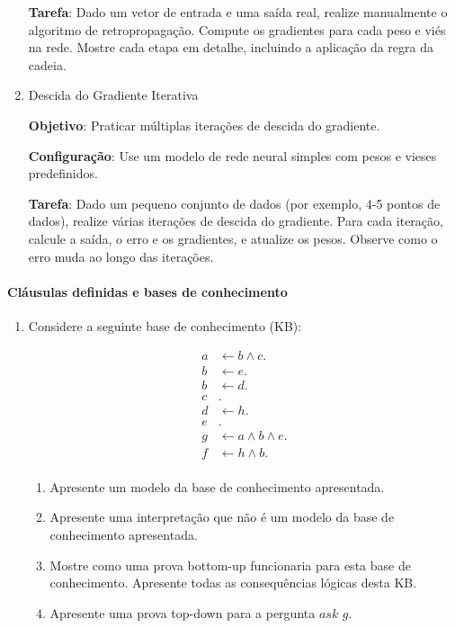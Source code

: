 \documentclass{article}
\begin{document}
\begin{enumerate}
\textbf{Tarefa}: Dado um vetor de entrada e uma saída real, realize manualmente o algoritmo de retropropagação. Compute os gradientes para cada peso e viés na rede. Mostre cada etapa em detalhe, incluindo a aplicação da regra da cadeia.

\item Descida do Gradiente Iterativa

\textbf{Objetivo}: Praticar múltiplas iterações de descida do gradiente.

\textbf{Configuração}: Use um modelo de rede neural simples com pesos e vieses predefinidos.

\textbf{Tarefa}: Dado um pequeno conjunto de dados (por exemplo, 4-5 pontos de dados), realize várias iterações de descida do gradiente. Para cada iteração, calcule a saída, o erro e os gradientes, e atualize os pesos. Observe como o erro muda ao longo das iterações.

\end{enumerate}

\pagebreak


\paragraph{Cláusulas definidas e bases de conhecimento}


\begin{enumerate}
    \item Considere a seguinte base de conhecimento (KB):
    
    \begin{center}
        \begin{align*}
         a & \leftarrow b \wedge c. \\ 
         b & \leftarrow e. \\ 
         b & \leftarrow d. \\ 
         c &. \\ 
         d & \leftarrow h. \\ 
         e &. \\
         g & \leftarrow a \wedge b  \wedge e. \\
         f & \leftarrow h \wedge b. \\  
        \end{align*}
    \end{center}
    

    \begin{enumerate}
        \item Apresente um modelo da base de conhecimento apresentada.
        \item Apresente uma interpretação que não é um modelo da base de conhecimento apresentada.
        \item Mostre como uma prova bottom-up funcionaria para esta base de conhecimento. Apresente todas as consequências lógicas desta KB.
        \item Apresente uma prova top-down para a pergunta $ask$ $g$.
    \end{enumerate}

\end{enumerate}
    
\end{document}
